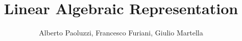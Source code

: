 \documentclass[10pt]{book}
\author{Alberto Paoluzzi, Francesco Furiani, Giulio Martella}
\title{Linear Algebraic Representation}
\begin{document}
\frontmatter
\maketitle
\tableofcontents


\mainmatter










\backmatter


{}

\end{document}
